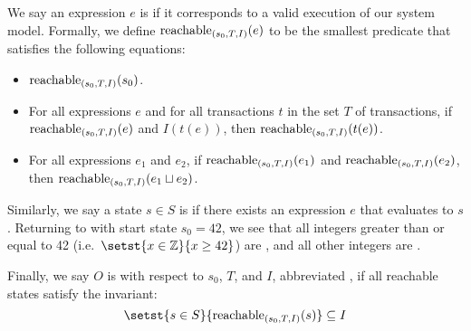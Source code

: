 We say an expression $e$ is  if it corresponds to a
valid execution of our system model. Formally, we define
$\text{reachable}_{(s_0, T, I)}(e)$ to be the smallest predicate that satisfies the
following equations:
\begin{itemize}
  \item
    $\text{reachable}_{(s_0, T, I)}(s_0)$.
  \item
    For all expressions $e$ and for all transactions $t$ in the set $T$ of
    transactions, if $\text{reachable}_{(s_0, T, I)}(e)$ and $I(t(e))$, then
    $\text{reachable}_{(s_0, T, I)}(t(e))$.
  \item
    For all expressions $e_1$ and $e_2$, if $\text{reachable}_{(s_0, T, I)}(e_1)$ and
    $\text{reachable}_{(s_0, T, I)}(e_2)$, then $\text{reachable}_{(s_0, T, I)}(e_1 \sqcup
    e_2)$.
\end{itemize}
Similarly, we say a state $s \in S$ is \sTIreachable{} if there exists an
\sTIreachable{} expression $e$ that evaluates to $s$. Returning to
 with start state $s_0 = 42$, we see that all integers greater
than or equal to 42 (i.e.\ $\setst{x \in \ints}{x \geq 42}$) are
\sTIreachable{}, and all other integers are \sTIunreachable{}.

Finally, we say $O$ is  with respect to $s_0$,
$T$, and $I$, abbreviated , if all reachable states
satisfy the invariant:
\[
  \setst{s \in S}{\sTIreachablepredicate{s}} \subseteq I
\]
